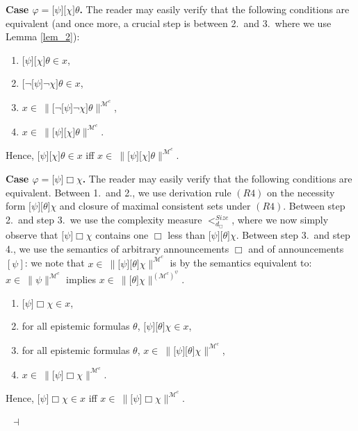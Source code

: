 \documentclass{article}[12pt]
\newenvironment{proof}{\noindent {\bf Proof \ }}{\hfill ~$\dashv$}
\renewcommand{\phi}{\varphi}
\begin{document}
\begin{proof}
\medskip \noindent 
{\bf Case $\phi=\lbrack\psi\rbrack\lbrack\chi\rbrack\theta$.}
The reader may easily verify that the following conditions are equivalent (and once more, a crucial step is between 2.\ and 3.\, where we use Lemma \ref{lem_2}): 
\begin{enumerate}
\item $\lbrack\psi\rbrack\lbrack\chi\rbrack\theta\in x$,
\item $\lbrack\neg\lbrack\psi\rbrack\neg\chi\rbrack\theta\in x$,
\item $x\in \ \parallel\lbrack\neg\lbrack\psi\rbrack\neg\chi\rbrack\theta\parallel^{\mathcal{M}^{c}}$,
\item $x\in \ \parallel\lbrack\psi\rbrack\lbrack\chi\rbrack\theta\parallel^{\mathcal{M}^{c}}$.
\end{enumerate}
Hence, $\lbrack\psi\rbrack\lbrack\chi\rbrack\theta\in x$ iff $x\in \ \parallel\lbrack\psi\rbrack\lbrack\chi\rbrack\theta\parallel^{\mathcal{M}^{c}}$.


\medskip \noindent 
{\bf Case $\phi=\lbrack\psi\rbrack\Box\chi$.}
The reader may easily verify that the following conditions are equivalent. Between 1.\ and 2., we use derivation rule $(R4)$ on the necessity form $\lbrack\psi\rbrack\lbrack\theta\rbrack\chi$ and closure of maximal consistent sets under $(R4)$. Between step 2.\ and step 3.\, we use the complexity measure $<^{Size}_{d_\Box}$, where we now simply observe that $\lbrack\psi\rbrack\Box\chi$ contains one $\Box$ less than $\lbrack\psi\rbrack\lbrack\theta\rbrack\chi$. Between step 3.\ and step 4., we use the semantics of arbitrary announcements $\Box$ and of announcements $[\psi]$: we note that  $x\in \  \parallel\lbrack\psi\rbrack\lbrack\theta\rbrack\chi\parallel^{\mathcal{M}^{c}}$ is by the semantics equivalent to: $x\in \  \parallel\psi\parallel^{\mathcal{M}^{c}}$ implies $x\in \  \parallel\lbrack\theta\rbrack\chi\parallel^{({\mathcal{M}^{c}})^\psi}$.
\begin{enumerate}
\item $\lbrack\psi\rbrack\Box\chi\in x$,
\item for all epistemic formulas $\theta$, $\lbrack\psi\rbrack\lbrack\theta\rbrack\chi\in x$,
\item for all epistemic formulas $\theta$, $x\in \ \parallel\lbrack\psi\rbrack\lbrack\theta\rbrack\chi\parallel^{\mathcal{M}^{c}}$,
\item $x\in \ \parallel \lbrack\psi\rbrack\Box\chi\parallel^{\mathcal{M}^{c}}$.
\end{enumerate}
Hence, $\lbrack\psi\rbrack\Box\chi\in x$ iff $x\in \ \parallel \lbrack\psi\rbrack\Box\chi\parallel^{\mathcal{M}^{c}}$.



\end{proof}
\end{document}
